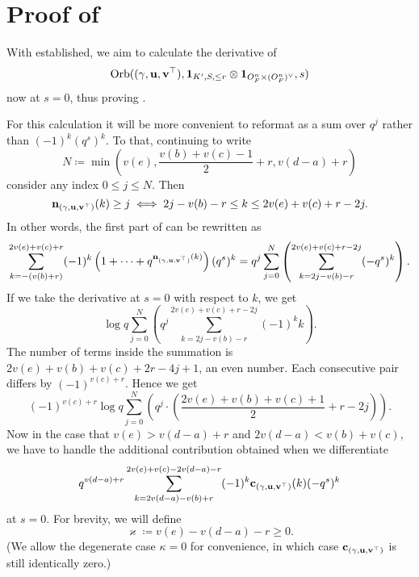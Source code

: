 \section{Proof of }
With  established, we aim to calculate the derivative of
\[ \operatorname{Orb}({(\gamma, \mathbf u, \mathbf v^\top)}, \mathbf{1}_{K', S, \le r} \otimes \mathbf{1}_{O_F^n \times (O_F^n)^\vee}, s) \]
now at $s = 0$, thus proving .

For this calculation it will be more convenient to reformat 
as a sum over $q^j$ rather than $(-1)^k (q^s)^k$.
To that, continuing to write
\[ N \coloneqq \min \left(
    v(e), \frac{v(b)+v(c)-1}{2} + r,
    v(d-a) + r \right) \]
consider any index $0 \le j \le N$.
Then
\[ \mathbf n_{(\gamma, \mathbf u, \mathbf v^\top)}(k) \ge j \iff 2j - v(b) - r \le k \le 2v(e)+v(c)+r-2j. \]
In other words, the first part of  can be rewritten as
\[ \sum_{k = -(v(b)+r)}^{2v(e)+v(c)+r} (-1)^k
  \left( 1 + \dots + q^{\mathbf n_{(\gamma, \mathbf u, \mathbf v^\top)}(k)} \right) (q^s)^k
  = q^j \sum_{j=0}^N \left( \sum_{k=2j-v(b)-r}^{2v(e)+v(c)+r-2j} (-q^s)^k \right). \]
If we take the derivative at $s = 0$ with respect to $k$, we get
\[ \log q \sum_{j=0}^N \left( q^j \sum_{k=2j-v(b)-r}^{2v(e)+v(c)+r-2j} (-1)^k k \right). \]
The number of terms inside the summation is
$2v(e)+v(b)+v(c)+2r-4j+1$, an even number.
Each consecutive pair differs by $(-1)^{v(c)+r}$.
Hence we get
\[ (-1)^{v(c)+r} \log q \sum_{j=0}^N \left( q^j
  \cdot \left( \frac{2v(e)+v(b)+v(c)+1}{2} + r - 2j \right) \right). \]
Now in the case that $v(e) > v(d-a) + r$ and $2v(d-a) < v(b) + v(c)$,
we have to handle the additional contribution obtained when we differentiate
\begin{equation}
  q^{v(d-a)+r}
  \sum_{k = 2v(d-a)-v(b)+r}^{2v(e)+v(c)-2v(d-a)-r} (-1)^k \mathbf c_{(\gamma, \mathbf u, \mathbf v^\top)}(k) (-q^s)^k
  \label{eq:top_derivative}
\end{equation}
at $s = 0$.
For brevity, we will define
\[ \varkappa \coloneqq v(e) - v(d-a) - r \ge 0. \]
(We allow the degenerate case $\kappa = 0$ for convenience,
in which case $\mathbf c_{(\gamma, \mathbf u, \mathbf v^\top)}$ is still identically zero.)

